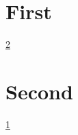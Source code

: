 \setcounter{tocdepth}{3}
\tableofcontents
\chapter{First}
\label{s:1}
\hyperref[s:2]{2}

\chapter{Second}
\label{s:2}
\hyperref[s:1]{1}

